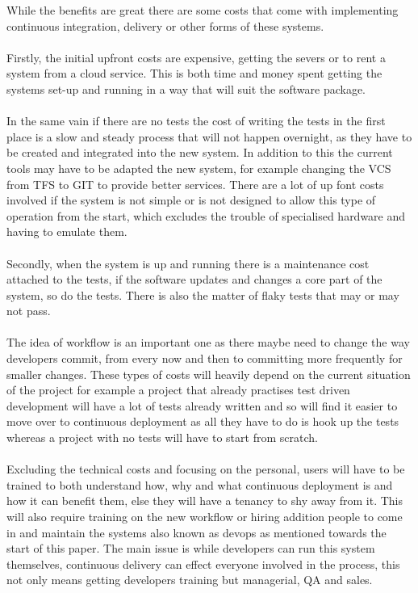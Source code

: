 While the benefits are great there are some costs that come with implementing continuous integration, delivery or other forms of these systems.
\\\\
Firstly, the initial upfront costs are expensive, getting the severs or to rent a system from a cloud service. This is both time and money spent getting the systems set-up and running in a way that will suit the software package. 
\\\\
In the same vain if there are no tests the cost of writing the tests in the first place is a slow and steady process that will not happen overnight, as they have to be created and integrated into the new system. In addition to this the current tools may have to be adapted the new system, for example changing the VCS from TFS to GIT to provide better services. There are a lot of up font costs involved if the system is not simple or is not designed to allow this type of operation from the start, which excludes the trouble of specialised hardware and having to emulate them. 
\\\\
Secondly, when the system is up and running there is a maintenance cost attached to the tests, if the software updates and changes a core part of the system, so do the tests. There is also the matter of flaky tests that may or may not pass.
\\\\
The idea of workflow is an important one as there maybe need to change the way developers commit, from every now and then to committing more frequently for smaller changes. These types of costs will heavily depend on the current situation of the project for example a project that already practises test driven development will have a lot of tests already written and so will find it easier to move over to continuous deployment as all they have to do is hook up the tests whereas a project with no tests will have to start from scratch. 
\\\\
Excluding the technical costs and focusing on the personal, users will have to be trained to both understand how, why and what continuous deployment is and how it can benefit them, else they will have a tenancy to shy away from it. This will also require training on the new workflow or hiring addition people to come in and maintain the systems also known as devops as mentioned towards the start of this paper. The main issue is while developers can run this system themselves, continuous delivery can effect everyone involved in the process, this not only means getting developers training but managerial, QA and sales. 

